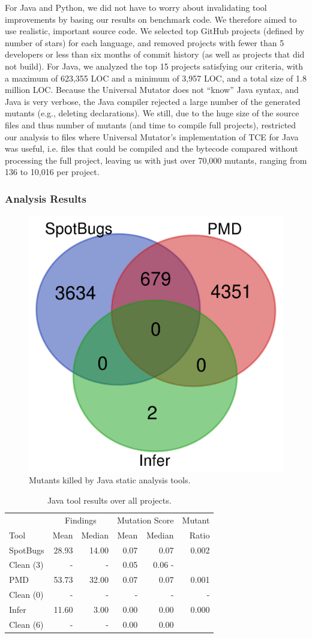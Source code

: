 For Java and Python, we did not have to worry about invalidating tool improvements by basing our results on benchmark code.  We therefore aimed to use realistic, important source code.  We selected top GitHub projects (defined by number of stars) for each language, and removed projects with fewer than 5 developers or less than six months of commit history (as well as projects that did not build).  For Java, we analyzed the top 15 projects satisfying our criteria, with a maximum of 623,355 LOC and a minimum of 3,957 LOC, and a total size of 1.8 million LOC.  Because the Universal Mutator does not ``know'' Java syntax, and Java is very verbose, the Java compiler rejected a large number of the generated mutants (e.g., deleting declarations).  We still, due to the huge size of the source files and thus number of mutants (and time to compile full projects), restricted our analysis to files where Universal Mutator's implementation of TCE \cite{TCE} for Java was useful, i.e. files that could be compiled and the bytecode compared without processing the full project, leaving us with just over 70,000 mutants, ranging from 136 to 10,016 per project.

\subsubsection{Analysis Results}


\begin{figure}
  \includegraphics[width=0.35\columnwidth]{java.png}
  \caption{Mutants killed by Java static analysis tools.}
  \label{fig:javavenn}
\end{figure}

\begin{table}
  \begin{tabular}{l|r|r|r|r|r}
    & \multicolumn{2}{|c|}{Findings} & \multicolumn{2}{|c|}{Mutation Score}  & Mutant \\
    Tool & Mean & Median & Mean & Median & Ratio\\
    \hline
    \hline
    SpotBugs & 28.93 & 14.00 & 0.07 & 0.07 & 0.002 \\
    Clean (3) & - & - & 0.05 & 0.06 - \\
    \hline
    PMD & 53.73 & 32.00 & 0.07 & 0.07 & 0.001 \\
    Clean (0) & - & - & - & - & - \\
    \hline
    Infer & 11.60 & 3.00 & 0.00 & 0.00 &  0.000 \\
    Clean (6) & - & - & 0.00 & 0.00 \\
    \hline
  \end{tabular}
  \caption{Java tool results over all projects.}
  \label{tab:scorejava}
\end{table}



